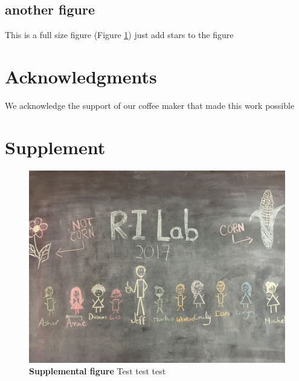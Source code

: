 \documentclass[article,9pt,twocolumn,twoside]{rilabRxiv}
\newcommand{\beginsupplement}{%
        \setcounter{table}{0}
        \renewcommand{\thetable}{S\arabic{table}}%
        \setcounter{figure}{0}
        \renewcommand{\thefigure}{S\arabic{figure}}%
     }
\begin{document}
\subsection{another figure}
This is a full size figure (Figure \ref{fig:S1}) just add stars to the figure


\section{Acknowledgments}
We acknowledge the support of our coffee maker that made this work possible



\onecolumn
\section*{Supplement}



\beginsupplement


\blindtext
\begin{figure}[h!]
\includegraphics[width=.9\linewidth]{figures/lab_group.png}
\caption{\textbf{Supplemental figure} Test test test}
\label{fig:S1}
\end{figure}
\pagebreak
\end{document}
